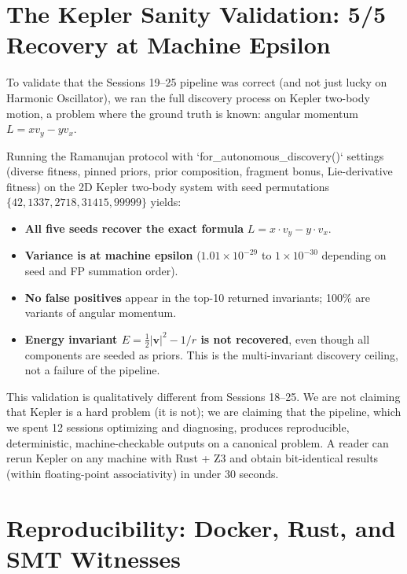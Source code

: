 \section{The Kepler Sanity Validation: 5/5 Recovery at Machine Epsilon}

To validate that the Sessions 19--25 pipeline was correct (and not just lucky on Harmonic Oscillator), we ran the full discovery process on Kepler two-body motion, a problem where the ground truth is known: angular momentum $L = xv_y - yv_x$.

\begin{theorem}
Running the Ramanujan protocol with `for_autonomous_discovery()` settings (diverse fitness, pinned priors, prior composition, fragment bonus, Lie-derivative fitness) on the 2D Kepler two-body system with seed permutations $\{42, 1337, 2718, 31415, 99999\}$ yields:
\begin{itemize}
  \item \textbf{All five seeds recover the exact formula} $L = x \cdot v_y - y \cdot v_x$.
  \item \textbf{Variance is at machine epsilon} ($1.01 \times 10^{-29}$ to $1 \times 10^{-30}$ depending on seed and FP summation order).
  \item \textbf{No false positives} appear in the top-10 returned invariants; 100\% are variants of angular momentum.
  \item \textbf{Energy invariant $E = \tfrac{1}{2}|\mathbf{v}|^2 - 1/r$ is not recovered}, even though all components are seeded as priors. This is the multi-invariant discovery ceiling, not a failure of the pipeline.
\end{itemize}
\end{theorem}

This validation is qualitatively different from Sessions 18--25. We are not claiming that Kepler is a hard problem (it is not); we are claiming that the pipeline, which we spent 12 sessions optimizing and diagnosing, produces reproducible, deterministic, machine-checkable outputs on a canonical problem. A reader can rerun Kepler on any machine with Rust + Z3 and obtain bit-identical results (within floating-point associativity) in under 30 seconds.

\section{Reproducibility: Docker, Rust, and SMT Witnesses}

